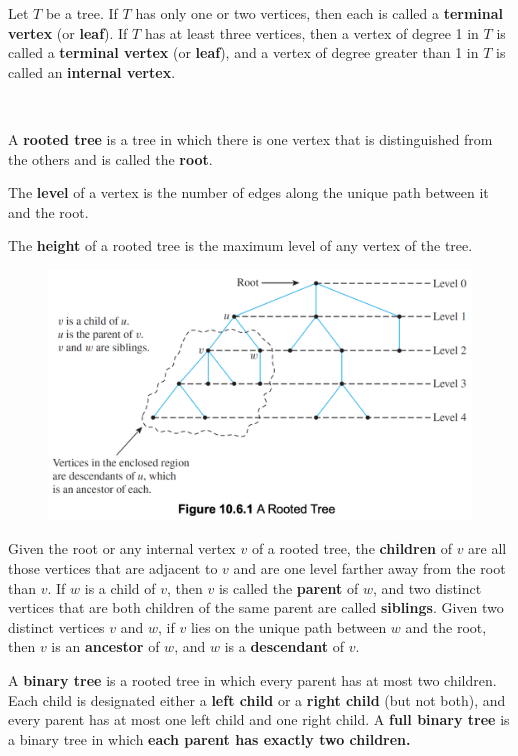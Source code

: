 \documentclass{article}
\begin{document}
\begin{description}
    \item[Terminal vertex (leaf) and internal vertex]Let $T$ be a tree. If $T$ has only one or two vertices, then each is called a \textbf{terminal vertex} (or \textbf{leaf}). If $T$ has at least three vertices, then a vertex of degree 1 in $T$ is called a \textbf{terminal vertex} (or \textbf{leaf}), and a vertex of degree greater than 1 in $T$ is called an \textbf{internal vertex}.
    \item[Rooted Tree, Level, Height] \
    \item \qquad A \textbf{rooted tree} is a tree in which there is one vertex that is distinguished from the others and is called the \textbf{root}. 
    \item \qquad The \textbf{level} of a vertex is the number of edges along the unique path between it and the root.
    \item \qquad The \textbf{height} of a rooted tree is the maximum level of any vertex of the tree.
    
    \begin{figure}[H]
    	\centering
	    \includegraphics[scale=0.5]{rooted_tree}
	\end{figure}
	
    \item[Child, Parent, Sibling, Ancestor, Descendant] Given the root or any internal vertex $v$ of a rooted tree, the \textbf{children} of $v$ are all those vertices that are adjacent to $v$ and are one level farther away from the root than $v$. If $w$ is a child of $v$, then $v$ is called the \textbf{parent} of $w$, and two distinct vertices that are both children of the same parent are called \textbf{siblings}. Given two distinct vertices $v$ and $w$, if $v$ lies on the unique path between $w$ and the root, then $v$ is an \textbf{ancestor} of $w$, and $w$ is a \textbf{descendant} of $v$.
    \item[Binary Tree / Full Binary Tree]A \textbf{binary tree} is a rooted tree in which every parent has at most two children. Each child is designated either a \textbf{left child} or a \textbf{right child} (but not both), and every parent has at most one left child and one right child. A \textbf{full binary tree} is a binary tree in which \textbf{each parent has exactly two children.}
    

\end{description}
\end{document}

